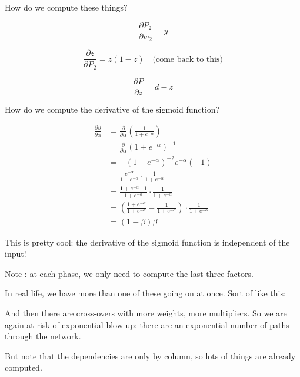 How do we compute these things?

\begin{displaymath}
  \frac{\partial P_2}{\partial w_2} = y
\end{displaymath}

\begin{displaymath}
  \frac{\partial z}{\partial P_2} = z(1-z) \quad \mbox{(come back to this)}
\end{displaymath}

\begin{displaymath}
  \frac{\partial P}{\partial z} = d-z
\end{displaymath}

How do we compute the derivative of the sigmoid function?


\begin{align*}
  \frac{\partial\beta}{\partial\alpha}
  & = \frac{\partial}{\partial\alpha} \left( \frac{1}{1+e^{-\alpha}} \right) \\[3mm]
  & = \frac{\partial}{\partial\alpha} \left(1+e^{-\alpha}\right)^{-1} \\[3mm]
  & = -\left(1+e^{-\alpha}\right)^{-2} e^{-\alpha} (-1) \\[3mm]
  & = \frac{e^{-\alpha}}{1+e^{-\alpha}} \cdot \frac{1}{1+e^{-\alpha}} \\[3mm]
  & = \frac{\mathbf{1+} e^{-\alpha} \mathbf{-1}}{1+e^{-\alpha}} \cdot \frac{1}{1+e^{-\alpha}} \\[3mm]
  & = \left(\frac{1+e^{-\alpha}}{1+e^{-\alpha}} - \frac{1}{1+e^{-\alpha}}\right)
    \cdot \frac{1}{1+e^{-\alpha}} \\[3mm]
  & = (1-\beta)\beta
\end{align*}

This is pretty cool: the derivative of the sigmoid function is independent of the input!

Note : at each phase, we only need to compute the last three factors.



In real life, we have more than one of these going on at once.  Sort of like this:



And then there are cross-overs with more weights, more multipliers.
So we are again at risk of exponential blow-up: there are an
exponential number of paths through the network.

But note that the dependencies are only by column, so lots of things
are already computed.

